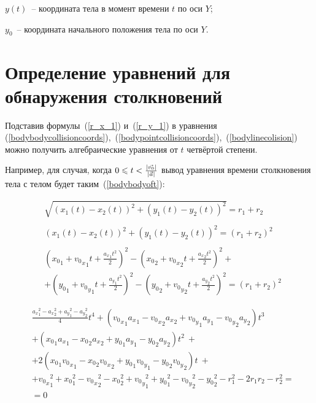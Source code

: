 \begin{Underequation}
  \(y(t)\)~-- координата тела в момент времени \(t\) по оси \(Y\);

  \(y_0\)~-- координата начального положения тела по оси \(Y\).
\end{Underequation}


\section{Определение уравнений для обнаружения столкновений}\label{collisiondetectioneqs}

Подставив формулы~(\ref{r_x_1}) и~(\ref{r_y_1}) в уравнения
(\ref{bodybodycollisioncoords}),~(\ref{bodypointcollisioncoords}),~(\ref{bodylinecolision})
можно получить алгебраические уравнения от \(t\) четвёртой степени.

Например, для случая, когда \(0 \leqslant t < \frac{\left|\vec{v_0}\right|}{\left|\vec{a}\right|}\) вывод уравнения времени столкновения тела с телом будет таким~(\ref{bodybodyoft}):

\begin{align}
  & \sqrt{(x_1(t) - x_2(t))^2 + (y_1(t) - y_2(t))^2}         = r_1 + r_2     \nonumber \\
  & \nonumber \\
  & (x_1(t) - x_2(t))^2 + (y_1(t) - y_2(t))^2                = (r_1 + r_2)^2 \nonumber            \\
  & \nonumber \\
  & ({x_0}_1 + {{v_0}_x}_1 t + \frac{{a_x}_1 t^2}{2})^2 - ({x_0}_2 + {{v_0}_x}_2 t + \frac{{a_x}_2 t^2}{2})^2 +  \nonumber                            \\
  & + ({y_0}_1 + {{v_0}_y}_1 t + \frac{{a_y}_1 t^2}{2})^2 - ({y_0}_2 + {{v_0}_y}_2 t + \frac{{a_y}_2 t^2}{2})^2    = (r_1 + r_2)^2 \nonumber
\end{align}

\begin{align}\label{bodybodyoft}
 & \frac{{a_x}_1^2 - {a_x}_2^2 + {a_y}_1^2 - {a_y}_2^2  }{4}   t^4 + ({{v_0}_x}_1 {a_x}_1 - {{v_0}_x}_2 {a_x}_2 + {{v_0}_y}_1 {a_y}_1 - {{v_0}_y}_2 {a_y}_2) t^3 \nonumber                        \\
 & + ({x_0}_1 {a_x}_1 - {x_0}_2 {a_x}_2 + {y_0}_1 {a_y}_1 - {y_0}_2 {a_y}_2)                                                     t^2~+  \nonumber                        \\
 & + 2 ({x_0}_1 {{v_0}_x}_1 - {x_0}_2 {{v_0}_x}_2 + {y_0}_1 {{v_0}_y}_1 - {y_0}_2 {{v_0}_y}_2)                                   t~+                                     \\
 & + {{v_0}_x}_1^2 + {x_0}_1^2 - {{v_0}_x}_2^2 - {x_0}_2^2 + {{v_0}_y}_1^2 + {y_0}_1^2 - {{v_0}_y}_2^2 - {y_0}_2^2  - r_1^2 - 2r_1 r_2 - r_2^2 = \nonumber \\
 & = 0 \nonumber
\end{align}

